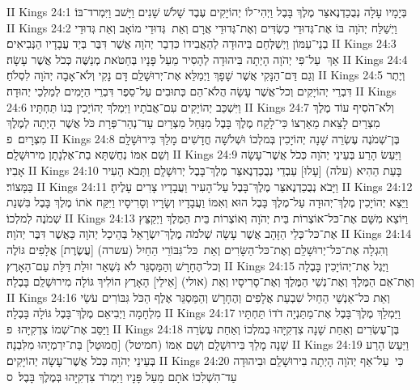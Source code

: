 II Kings 24:1	בְּיָמָיו עָלָה נְבֻכַדְנֶאצַּר מֶלֶךְ בָּבֶל וַיְהִי־לוֹ יְהוֹיָקִים עֶבֶד שָׁלֹשׁ שָׁנִים וַיָּשׁב וַיִּמְרד־בּוֹ׃
II Kings 24:2	וַיְשַׁלַּח יְהֹוָה  בּוֹ אֶת־גְּדוּדֵי כַשְׂדִּים וְאֶת־גְּדוּדֵי אֲרָם וְאֵת  גְּדוּדֵי מוֹאָב וְאֵת גְּדוּדֵי בְנֵי־עַמּוֹן וַיְשַׁלְּחֵם בִּיהוּדָה לְהַאֲבִידוֹ כִּדְבַר יְהֹוָה אֲשֶׁר דִּבֶּר בְּיַד עֲבָדָיו הַנְּבִיאִים׃
II Kings 24:3	אַךְ  עַל־פִּי יְהֹוָה הָיְתָה בִּיהוּדָה לְהָסִיר מֵעַל פָּנָיו בְּחַטֹּאת מְנַשֶּׁה כְּכֹל אֲשֶׁר עָשָׂה׃
II Kings 24:4	וְגַם דַּם־הַנָּקִי אֲשֶׁר שָׁפָךְ וַיְמַלֵּא אֶת־יְרוּשָׁלַ͏ִם דָּם נָקִי וְלֹא־אָבָה יְהֹוָה לִסְלֹחַ׃
II Kings 24:5	וְיֶתֶר דִּבְרֵי יְהוֹיָקִים וְכל־אֲשֶׁר עָשָׂה הֲלֹא־הֵם כְּתוּבִים עַל־סֵפֶר דִּבְרֵי הַיָּמִים לְמַלְכֵי יְהוּדָה׃
II Kings 24:6	וַיִּשְׁכַּב יְהוֹיָקִים עִם־אֲבֹתָיו וַיִּמְלֹךְ יְהוֹיָכִין בְּנוֹ תַּחְתָּיו׃
II Kings 24:7	וְלֹא־הֹסִיף עוֹד מֶלֶךְ מִצְרַיִם לָצֵאת מֵאַרְצוֹ כִּי־לָקַח מֶלֶךְ בָּבֶל מִנַּחַל מִצְרַיִם עַד־נְהַר־פְּרָת כֹּל אֲשֶׁר הָיְתָה לְמֶלֶךְ מִצְרָיִם׃ {פ}
II Kings 24:8	בֶּן־שְׁמֹנֶה עֶשְׂרֵה שָׁנָה יְהוֹיָכִין בְּמלְכוֹ וּשְׁלֹשָׁה חֳדָשִׁים מָלַךְ בִּירוּשָׁלָ͏ִם וְשֵׁם אִמּוֹ נְחֻשְׁתָּא בַת־אֶלְנָתָן מִירוּשָׁלָ͏ִם׃
II Kings 24:9	וַיַּעַשׂ הָרַע בְּעֵינֵי יְהֹוָה כְּכֹל אֲשֶׁר־עָשָׂה אָבִיו׃
II Kings 24:10	בָּעֵת הַהִיא (עלה) [עָלוּ] עַבְדֵי נְבֻכַדְנֶאצַּר מֶלֶךְ־בָּבֶל יְרוּשָׁלָ͏ִם וַתָּבֹא הָעִיר בַּמָּצוֹר׃
II Kings 24:11	וַיָּבֹא נְבֻכַדְנֶאצַּר מֶלֶךְ־בָּבֶל עַל־הָעִיר וַעֲבָדָיו צָרִים עָלֶיהָ׃
II Kings 24:12	וַיֵּצֵא יְהוֹיָכִין מֶלֶךְ־יְהוּדָה עַל־מֶלֶךְ בָּבֶל הוּא וְאִמּוֹ וַעֲבָדָיו וְשָׂרָיו וְסָרִיסָיו וַיִּקַּח אֹתוֹ מֶלֶךְ בָּבֶל בִּשְׁנַת שְׁמֹנֶה לְמלְכוֹ׃
II Kings 24:13	וַיּוֹצֵא מִשָּׁם אֶת־כּל־אוֹצְרוֹת בֵּית יְהֹוָה וְאוֹצְרוֹת בֵּית הַמֶּלֶךְ וַיְקַצֵּץ אֶת־כּל־כְּלֵי הַזָּהָב אֲשֶׁר עָשָׂה שְׁלֹמֹה מֶלֶךְ־יִשְׂרָאֵל בְּהֵיכַל יְהֹוָה כַּאֲשֶׁר דִּבֶּר יְהֹוָה׃
II Kings 24:14	וְהִגְלָה אֶת־כּל־יְרוּשָׁלַ͏ִם וְאֶת־כּל־הַשָּׂרִים וְאֵת  כּל־גִּבּוֹרֵי הַחַיִל (עשרה) [עֲשֶׂרֶת] אֲלָפִים גּוֹלֶה וְכל־הֶחָרָשׁ וְהַמַּסְגֵּר לֹא נִשְׁאַר זוּלַת דַּלַּת עַם־הָאָרֶץ׃
II Kings 24:15	וַיֶּגֶל אֶת־יְהוֹיָכִין בָּבֶלָה וְאֶת־אֵם הַמֶּלֶךְ וְאֶת־נְשֵׁי הַמֶּלֶךְ וְאֶת־סָרִיסָיו וְאֵת (אולי) [אֵילֵי] הָאָרֶץ הוֹלִיךְ גּוֹלָה מִירוּשָׁלַ͏ִם בָּבֶלָה׃
II Kings 24:16	וְאֵת כּל־אַנְשֵׁי הַחַיִל שִׁבְעַת אֲלָפִים וְהֶחָרָשׁ וְהַמַּסְגֵּר אֶלֶף הַכֹּל גִּבּוֹרִים עֹשֵׂי מִלְחָמָה וַיְבִיאֵם מֶלֶךְ־בָּבֶל גּוֹלָה בָּבֶלָה׃
II Kings 24:17	וַיַּמְלֵךְ מֶלֶךְ־בָּבֶל אֶת־מַתַּנְיָה דֹדוֹ תַּחְתָּיו וַיַּסֵּב אֶת־שְׁמוֹ צִדְקִיָּהוּ׃ {פ}
II Kings 24:18	בֶּן־עֶשְׂרִים וְאַחַת שָׁנָה צִדְקִיָּהוּ בְמלְכוֹ וְאַחַת עֶשְׂרֵה שָׁנָה מָלַךְ בִּירוּשָׁלָ͏ִם וְשֵׁם אִמּוֹ (חמיטל) [חֲמוּטַל] בַּת־יִרְמְיָהוּ מִלִּבְנָה׃
II Kings 24:19	וַיַּעַשׂ הָרַע בְּעֵינֵי יְהֹוָה כְּכֹל אֲשֶׁר־עָשָׂה יְהוֹיָקִים׃
II Kings 24:20	כִּי  עַל־אַף יְהֹוָה הָיְתָה בִירוּשָׁלַ͏ִם וּבִיהוּדָה עַד־הִשְׁלִכוֹ אֹתָם מֵעַל פָּנָיו וַיִּמְרֹד צִדְקִיָּהוּ בְּמֶלֶךְ בָּבֶל׃ {ס}        
